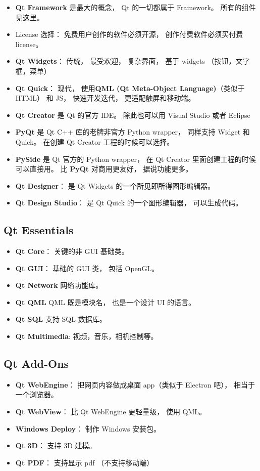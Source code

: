 
\begin{issues}
\issueDraft
\end{issues}

\begin{itemize}
\item \textbf{Qt Framework} 是最大的概念， Qt 的一切都属于 Framework。 所有的组件\href{https://doc.qt.io/qt-6/qtmodules.html}{见这里}。
\item License 选择： 免费用户创作的软件必须开源， 创作付费软件必须买付费 license。
\item \textbf{Qt Widgets}： 传统， 最受欢迎， 复杂界面， 基于 widgets （按钮，文字框，菜单）
\item \textbf{Qt Quick}： 现代， 使用\textbf{QML (Qt Meta-Object Language)}（类似于 HTML） 和 JS， 快速开发迭代， 更适配触屏和移动端。
\item \textbf{Qt Creator} 是 Qt 的官方 IDE。 除此也可以用 Visual Studio 或者 Eclipse
\item \textbf{PyQt} 是 Qt C++ 库的老牌非官方 Python wrapper， 同样支持 Widget 和 Quick。 在创建 Qt Creator 工程的时候可以选择。
\item \textbf{PySide} 是 Qt 官方的 Python wrapper， 在 Qt Creator 里面创建工程的时候可以直接用。 比 \textbf{PyQt} 对商用更友好， 据说功能更多。
\item \textbf{Qt Designer}： 是 Qt Widgets 的一个所见即所得图形编辑器。
\item \textbf{Qt Design Studio}： 是 Qt Quick 的一个图形编辑器， 可以生成代码。
\end{itemize}

\subsection{Qt Essentials}
\begin{itemize}
\item \textbf{Qt Core}： 关键的非 GUI 基础类。
\item \textbf{Qt GUI}： 基础的 GUI 类， 包括 OpenGL。
\item \textbf{Qt Network} 网络功能库。
\item \textbf{Qt QML} QML 既是模块名， 也是一个设计 UI 的语言。
\item \textbf{Qt SQL} 支持 SQL 数据库。
\item \textbf{Qt Multimedia}: 视频，音乐，相机控制等。
\end{itemize}

\subsection{Qt Add-Ons}
\begin{itemize}
\item \textbf{Qt WebEngine}： 把网页内容做成桌面 app（类似于 Electron 吧）， 相当于一个浏览器。
\item \textbf{Qt WebView}： 比 Qt WebEngine 更轻量级， 使用 QML。
\item \textbf{Windows Deploy}： 制作 Windows 安装包。
\item \textbf{Qt 3D}： 支持 3D 建模。
\item \textbf{Qt PDF}： 支持显示 pdf （不支持移动端）
\end{itemize}


